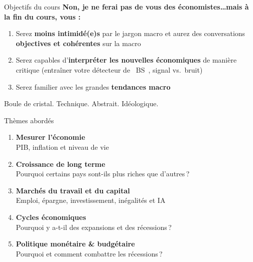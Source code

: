 \documentclass[aspectratio=169]{beamer}
\begin{document}

\begin{frame}{Objectifs du cours}
   \textbf{Non, je ne ferai pas de vous des économistes\ldots mais à la fin du cours, vous :}
   \vspace{0.3cm}
   \begin{enumerate}
      \setlength\itemsep{0.3cm}
      \item Serez \textbf{moins intimidé(e)s} par le jargon macro et aurez des conversations \textbf{objectives et cohérentes} sur la macro
      \item Serez capables d'\textbf{interpréter les nouvelles économiques} de manière critique (entraîner votre détecteur de \guillemotleft~BS~\guillemotright, signal vs.\ bruit)
      \item Serez familier avec les grandes \textbf{tendances macro}
   \end{enumerate}
   \vspace{0.25cm}
   \begin{defbox}
      Boule de cristal. Technique. Abstrait. Idéologique.
   \end{defbox}
\end{frame}

\begin{frame}{Thèmes abordés}
   \begin{enumerate}
      \setlength\itemsep{0.35cm}
      \item \textbf{Mesurer l'économie} \\
      {\small PIB, inflation et niveau de vie}
      \item \textbf{Croissance de long terme} \\
      {\small Pourquoi certains pays sont-ils plus riches que d'autres\,?}
      \item \textbf{Marchés du travail et du capital} \\
      {\small Emploi, épargne, investissement, inégalités et IA}
      \item \textbf{Cycles économiques} \\
      {\small Pourquoi y a-t-il des expansions et des récessions\,?}
      \item \textbf{Politique monétaire \& budgétaire} \\
      {\small Pourquoi et comment combattre les récessions\,?}
   \end{enumerate}
\end{frame}
\end{document}
